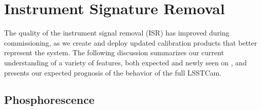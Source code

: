 %
%
%
%

\section{Instrument Signature Removal}
\label{sec:isr}
\newcommand{\czw}[1]{
  \textbf{CZW: }\textcolor{red}{#1}
}
The quality of the instrument signal removal (ISR) has improved during commissioning, as we create and deploy updated calibration products that better represent the \ComCam system.
The following discussion summarizes our current understanding of a variety of features, both expected and newly seen on \ComCam, and presents our expected prognosis of the behavior of the full LSSTCam.

\subsection{Phosphorescence}


